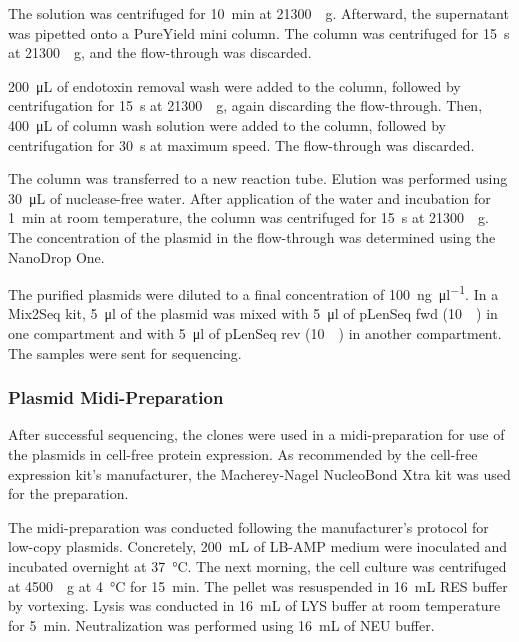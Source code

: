 The solution was centrifuged for \SI{10}{\minute} at \SI{21300}{\times g}. Afterward, the supernatant was pipetted onto a PureYield\textsuperscript{\texttrademark} mini column. The column was centrifuged for \SI{15}{\second} at \SI{21300}{\times g}, and the flow-through was discarded.

\SI{200}{\micro\liter} of endotoxin removal wash were added to the column, followed by centrifugation for \SI{15}{\second} at \SI{21300}{\times g}, again discarding the flow-through. Then, \SI{400}{\micro\liter} of column wash solution were added to the column, followed by centrifugation for \SI{30}{\second} at maximum speed. The flow-through was discarded.

The column was transferred to a new reaction tube. Elution was performed using \SI{30}{\micro\liter} of nuclease-free water. After application of the water and incubation for \SI{1}{\minute} at room temperature, the column was centrifuged for \SI{15}{\second} at \SI{21300}{\times g}. The concentration of the plasmid in the flow-through was determined using the NanoDrop\textsuperscript{\texttrademark} One.

The purified plasmids were diluted to a final concentration of \SI{100}{\nano\gram\per\micro\litre}. In a Mix2Seq kit, \SI{5}{\micro\litre} of the plasmid was mixed with \SI{5}{\micro\litre} of pLenSeq fwd (\SI{10}{\micro\Molar}) in one compartment and with \SI{5}{\micro\litre} of pLenSeq rev (\SI{10}{\micro\Molar}) in another compartment. The samples were sent for sequencing.

\subsubsection{Plasmid Midi-Preparation}
After successful sequencing, the clones were used in a midi-preparation for use of the plasmids in cell-free protein expression. As recommended by the cell-free expression kit's manufacturer, the Macherey-Nagel\textsuperscript{\textregistered} NucleoBond\textsuperscript{\textregistered} Xtra kit was used for the preparation. 

The midi-preparation was conducted following the manufacturer's protocol for low-copy plasmids. Concretely, \SI{200}{\milli\liter} of LB-AMP medium were inoculated and incubated overnight at \SI{37}{\celsius}. The next morning, the cell culture was centrifuged at \SI{4500}{\times g} at \SI{4}{\celsius} for \SI{15}{\minute}. The pellet was resuspended in \SI{16}{\milli\liter} RES buffer by vortexing. Lysis was conducted in \SI{16}{\milli\liter} of LYS buffer at room temperature for \SI{5}{\minute}. Neutralization was performed using \SI{16}{\milli\liter} of NEU buffer. 

